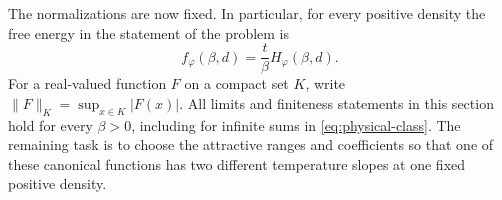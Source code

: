 The normalizations are now fixed. In particular, for every positive
density the free energy in the statement of the problem is
\begin{equation}
 f_\varphi(\beta,d)=\frac{t}{\beta}H_\varphi(\beta,d).
 \label{eq:free-energy-normalization}
\end{equation}
For a real-valued function $F$ on a compact set $K$, write
$\|F\|_K=\sup_{x\in K}|F(x)|$.
All limits and finiteness statements in this section hold for every
$\beta>0$, including for infinite sums in
\eqref{eq:physical-class}. The remaining task is to choose the
attractive ranges and coefficients so that one of these canonical
functions has two different temperature slopes at one fixed
positive density.
